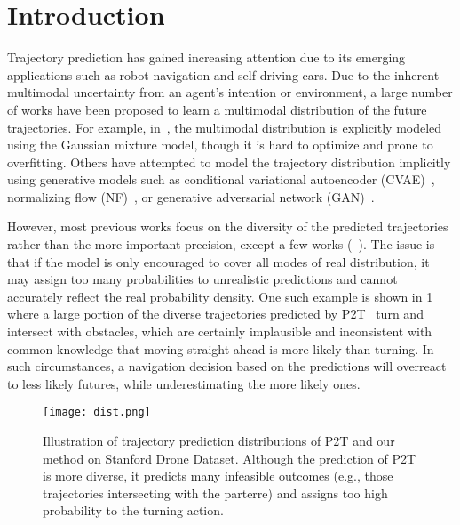 \documentclass[10pt,twocolumn,letterpaper]{article}
\begin{document}
\section{Introduction}
\label{sec:intro}
Trajectory prediction has gained increasing attention due to its emerging applications such as robot navigation and self-driving cars. Due to the inherent multimodal uncertainty from an agent's intention or environment, a large number of works have been proposed to learn a multimodal distribution of the future trajectories. For example, in~\cite{leung2016distributional,makansi2019overcoming}, the multimodal distribution is explicitly modeled using the Gaussian mixture model, though it is hard to optimize and prone to overfitting. Others have attempted to model the trajectory distribution implicitly using generative models such as conditional variational autoencoder (CVAE)~\cite{lee2017desire,salzmann2020trajectron++,mangalam2020not,deo2020trajectory}, normalizing flow (NF)~\cite{rhinehart2018r2p2,park2020diverse}, or generative adversarial network (GAN)~\cite{gupta2018social,amirian2019social,hu2020collaborative,sadeghian2019sophie,eiffert2020probabilistic}.

However, most previous works focus on the diversity of the predicted trajectories rather than the more important precision, except a few works (\eg~\cite{rhinehart2018r2p2,park2020diverse}). The issue is that if the model is only encouraged to cover all modes of real distribution, it may assign too many probabilities to unrealistic predictions and cannot accurately reflect the real probability density. One such example is shown in \cref{fig:dist} where a large portion of the diverse trajectories predicted by P2T~\cite{deo2020trajectory} turn and intersect with obstacles, which are certainly implausible and inconsistent with common knowledge that moving straight ahead is more likely than turning. In such circumstances, a navigation decision based on the predictions will overreact to less likely futures, while underestimating the more likely ones.

\begin{figure}[t]
	\centering
	\texttt{[image: dist.png]}
	\vspace{-0.6cm}
	\caption{Illustration of trajectory prediction distributions of P2T and our method on Stanford Drone Dataset. Although the prediction of P2T is more diverse, it predicts many infeasible outcomes (e.g., those trajectories intersecting with the parterre) and assigns too high probability to the turning action.}
	\vspace{-0.6cm}
	\label{fig:dist}
\end{figure}
\end{document}
